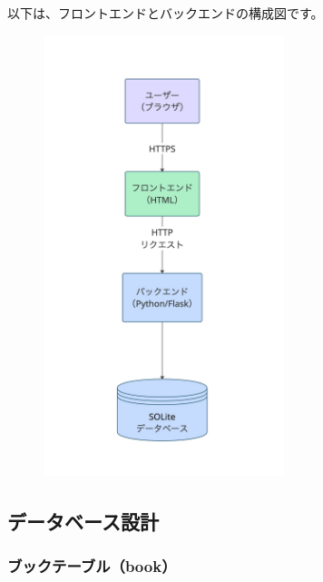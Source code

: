 \documentclass[a4paper, 11pt, titlepage]{jsarticle}
\begin{document}
以下は、フロントエンドとバックエンドの構成図です。
\begin{figure}[htbp]
\centering
\includegraphics[width=70mm]{systemStructure.jpg}
\label{fig:func}
\end{figure}

\subsection{データベース設計}
\subsubsection{ブックテーブル（book）}
\end{document}
